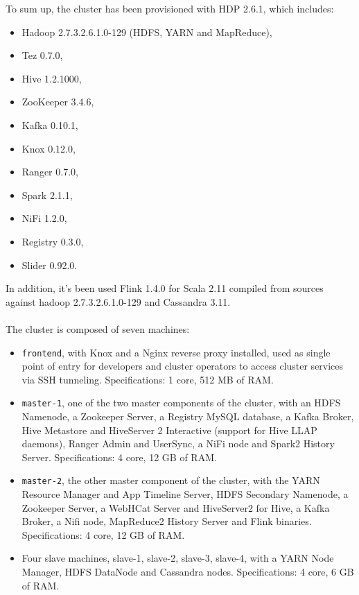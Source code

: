 To sum up, the cluster has been provisioned with HDP 2.6.1, which includes:
\begin{itemize}
    \item Hadoop 2.7.3.2.6.1.0-129 (HDFS, YARN and MapReduce),
    \item Tez 0.7.0,
    \item Hive 1.2.1000, 
    \item ZooKeeper 3.4.6,
    \item Kafka 0.10.1,
    \item Knox 0.12.0,
    \item Ranger 0.7.0,
    \item Spark 2.1.1,
    \item NiFi 1.2.0,
    \item Registry 0.3.0,
    \item Slider 0.92.0.
\end{itemize}

In addition, it's been used Flink 1.4.0 for Scala 2.11 compiled from sources against hadoop 2.7.3.2.6.1.0-129 and Cassandra 3.11.
\\
\\
The cluster is composed of seven machines:
\begin{itemize}
    \item \texttt{frontend}, with Knox and a Nginx reverse proxy installed, used as single point of entry for developers and cluster operators to access cluster services via SSH tunneling. Specifications: 1 core, 512 MB of RAM.
    \item \texttt{master-1}, one of the two master components of the cluster, with an HDFS Namenode, a Zookeeper Server, a Registry MySQL database, a Kafka Broker, Hive Metastore and HiveServer 2 Interactive (support for Hive LLAP daemons), Ranger Admin and UserSync, a NiFi node and Spark2 History Server. Specifications: 4 core, 12 GB of RAM.
    \item \texttt{master-2}, the other master component of the cluster, with the YARN Resource Manager and App Timeline Server, HDFS Secondary Namenode, a Zookeeper Server, a WebHCat Server and HiveServer2 for Hive, a Kafka Broker, a Nifi node, MapReduce2 History Server and Flink binaries. Specifications: 4 core, 12 GB of RAM.
    \item Four slave machines, slave-1, slave-2, slave-3, slave-4, with a YARN Node Manager, HDFS DataNode and Cassandra nodes. Specifications: 4 core, 6 GB of RAM.
\end{itemize}